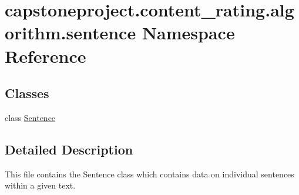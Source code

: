 \hypertarget{namespacecapstoneproject_1_1content__rating_1_1algorithm_1_1sentence}{}\section{capstoneproject.\+content\+\_\+rating.\+algorithm.\+sentence Namespace Reference}
\label{namespacecapstoneproject_1_1content__rating_1_1algorithm_1_1sentence}
\subsection*{Classes}
\begin{DoxyCompactItemize}
\item 
class \mbox{\hyperlink{classcapstoneproject_1_1content__rating_1_1algorithm_1_1sentence_1_1_sentence}{Sentence}}
\end{DoxyCompactItemize}


\subsection{Detailed Description}
\begin{DoxyVerb}This file contains the Sentence class which contains data on individual sentences within a given text.
\end{DoxyVerb}
 